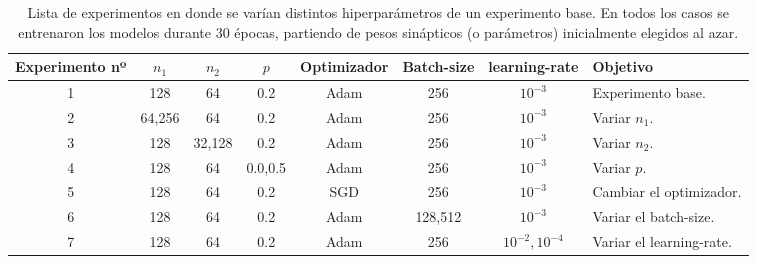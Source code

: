 \documentclass[aps,prl,preprint,groupedaddress]{revtex4-2}
\begin{document}
%
\begin{table}%
\begin{ruledtabular}
\begin{tabular}{cccccccl} %
Experimento nº & $n_1$ & $n_2$ & $p$ & Optimizador & Batch-size & learning-rate & Objetivo\\ %
\hline
1 & 128 & 64 & 0.2 & Adam & 256 & $10^{-3}$ & Experimento base. \\
2 & 64,256 & 64 & 0.2 & Adam & 256 & $10^{-3}$ & Variar $n_1$. \\
3 & 128 & 32,128 & 0.2 & Adam & 256 & $10^{-3}$ & Variar $n_2$. \\
4 & 128 & 64 & 0.0,0.5 & Adam & 256 & $10^{-3}$ & Variar $p$. \\
5 & 128 & 64 & 0.2 & SGD & 256 & $10^{-3}$ & Cambiar el optimizador. \\
6 & 128 & 64 & 0.2 & Adam & 128,512 & $10^{-3}$ & Variar el batch-size. \\
7 & 128 & 64 & 0.2 & Adam & 256 & $10^{-2},10^{-4}$ & Variar el learning-rate. \\
\end{tabular}
\end{ruledtabular}
\caption{
\label{tab1}
Lista de experimentos en donde se varían distintos hiperparámetros de un experimento base.
En todos los casos se entrenaron los modelos durante 30 épocas, partiendo de pesos sinápticos (o parámetros) inicialmente elegidos al azar.
}
\end{table}
\end{document}
